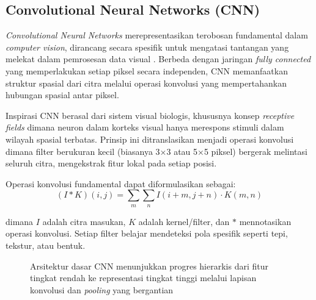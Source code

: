 \subsection{Convolutional Neural Networks (CNN)}

\textit{Convolutional Neural Networks} merepresentasikan terobosan fundamental dalam \textit{computer vision}, dirancang secara spesifik untuk mengatasi tantangan yang melekat dalam pemrosesan data visual \cite{lecun1998gradient}. Berbeda dengan jaringan \textit{fully connected} yang memperlakukan setiap piksel secara independen, CNN memanfaatkan struktur spasial dari citra melalui operasi konvolusi yang mempertahankan hubungan spasial antar piksel.

Inspirasi CNN berasal dari sistem visual biologis, khususnya konsep \textit{receptive fields} dimana neuron dalam korteks visual hanya merespons stimuli dalam wilayah spasial terbatas. Prinsip ini ditranslasikan menjadi operasi konvolusi dimana filter berukuran kecil (biasanya 3×3 atau 5×5 piksel) bergerak melintasi seluruh citra, mengekstrak fitur lokal pada setiap posisi.

Operasi konvolusi fundamental dapat diformulasikan sebagai:
\begin{equation}
(I * K)(i,j) = \sum_{m} \sum_{n} I(i+m, j+n) \cdot K(m,n)
\label{eq:convolution}
\end{equation}

dimana $I$ adalah citra masukan, $K$ adalah kernel/filter, dan $*$ mennotasikan operasi konvolusi. Setiap filter belajar mendeteksi pola spesifik seperti tepi, tekstur, atau bentuk.

\begin{figure}[H]
    \centering
    \caption{Arsitektur dasar CNN menunjukkan progres hierarkis dari fitur tingkat rendah ke representasi tingkat tinggi melalui lapisan konvolusi dan \textit{pooling} yang bergantian}
    \label{fig:cnn_architecture}
\end{figure}

